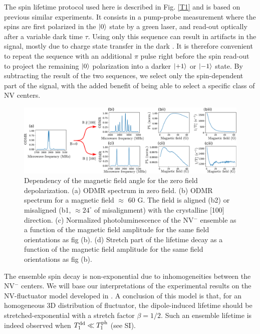 \documentclass[preprintnumbers,amsmath,amssymb,superscriptaddress,twocolumn,showpacs]{revtex4-2}
\begin{document}
The spin lifetime protocol used here is described in Fig. \ref{T1} and is based on previous similar experiments. It consists in a pump-probe measurement where the spins are first polarized in the $\ket{0}$ state by a green laser, and read-out optically after a variable dark time $\tau$. Using only this sequence can result in artifacts in the signal, mostly due to charge state transfer in the dark \citep{giri_coupled_2018}. It is therefore convenient to repeat the sequence with an additional $\pi$ pulse right before the spin read-out to project the remaining $\ket{0}$ polarization into a darker $\ket{+1}$ or $\ket{-1}$ state. By subtracting the result of the two sequences, we select only the spin-dependent part of the signal, with the added benefit of being able to select a specific class of NV centers. 

\begin{figure}
\includegraphics[width=.95\textwidth]{Figures/fig 100 vs 1x1x1x1}
\caption{Dependency of the magnetic field angle for the zero field depolarization. (a) ODMR spectrum in zero field. (b) ODMR spectrum for a magnetic field $\approx$ 60 G. The field is aligned (b2) or misaligned (b1, $\approx 24^\circ$ of misalignment) with the crystalline [100] direction. (c) Normalized photoluminescence of the NV$^-$ ensemble as a function of the magnetic field amplitude for the same field orientations as fig (b). (d) Stretch part of the lifetime decay as a function of the magnetic field amplitude for the same field orientations as fig (b).}
\label{100_VS_1x4}
\end{figure}

The ensemble spin decay is non-exponential due to inhomogeneities between the NV$^-$ centers. We will base our interpretations of the experimental results on the NV-fluctuator model developed in \citep{choi_depolarization_2017}. A conclusion of this model is that, for an homogeneous 3D distribution of fluctuator, the dipole-induced lifetime should be stretched-exponential with a stretch factor $\beta=1/2$. Such an ensemble lifetime is indeed observed when $T_1^{\rm dd} \ll T_1^{\rm ph}$  (see SI).
\end{document}
